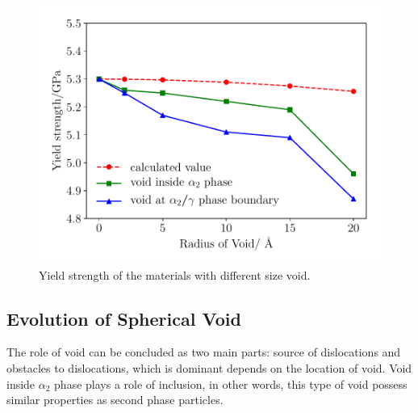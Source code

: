 \documentclass[materials,article,accept,moreauthors,pdftex,10pt,a4paper]{Definitions/mdpi}
\begin{document}
\begin{figure}[H]
\centering
\includegraphics[width=0.5\linewidth]{img/effect_of_vol}
\caption{Yield strength of the materials with different size void.}
\label{fig:strength}
\end{figure}



\subsection{Evolution of Spherical Void}
The role of void can be concluded as two main parts: source of dislocations and obstacles to dislocations, which is dominant depends on the location of void. Void inside $\alpha_2$ phase plays a role of inclusion, in other words, this type of void possess similar properties as second phase particles.
\end{document}

